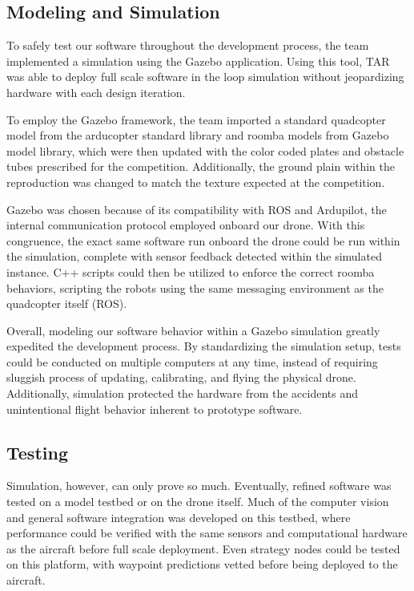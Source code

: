 \documentclass[12pt,letterpaper]{article}
\begin{document}
	\subsection*{Modeling and Simulation}

		To safely test our software throughout the development process, the team implemented a simulation using the Gazebo application. Using this tool, TAR was able to deploy full scale software in the loop simulation without jeopardizing hardware with each design iteration.

    	To employ the Gazebo framework, the team imported a standard quadcopter model from the arducopter standard library and roomba models from Gazebo model library, which were then updated with the color coded plates and obstacle tubes prescribed for the competition. Additionally, the ground plain within the reproduction was changed to match the texture expected at the competition. 

		Gazebo was chosen because of its compatibility with ROS and Ardupilot, the internal communication protocol employed onboard our drone. With this congruence, the exact same software run onboard the drone could be run within the simulation, complete with sensor feedback detected within the simulated instance.  C++ scripts could then be utilized to enforce the correct roomba behaviors, scripting the robots using the same messaging environment as the quadcopter itself (ROS).

		Overall, modeling our software behavior within a Gazebo simulation greatly expedited the development process. By standardizing the simulation setup, tests could be conducted on multiple computers at any time, instead of requiring sluggish process of updating, calibrating, and flying the physical drone. Additionally, simulation protected the hardware from the accidents and unintentional flight behavior inherent to prototype software.


	\subsection*{Testing}
		Simulation, however, can only prove so much. Eventually, refined software was tested on a model testbed or on the drone itself. Much of the computer vision and general software integration was developed on this testbed, where performance could be verified with the same sensors and computational hardware as the aircraft before full scale deployment. Even strategy nodes could be tested on this platform, with waypoint predictions vetted before being deployed to the aircraft. 
\end{document}
